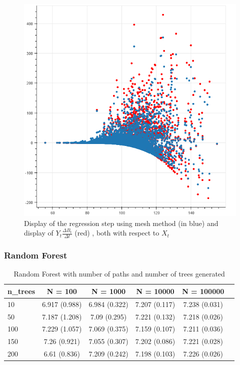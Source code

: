 \documentclass[english,11pt,openany]{report}
\theoremstyle{definition}
\theoremstyle{plain}
\theoremstyle{definition}
\begin{document}
\begin{figure}[H]
	\centering
	\captionsetup{width=0.8\textwidth}
	\includegraphics[scale = 0.3]{mesh/mesh.png}
	\caption{Display of the regression step using mesh method (in blue) and display of $Y_{t}\frac{\Delta B_t}{\Delta t}$ (red) , both with respect to $X_t$}
	
\end{figure}


 \subsubsection{Random Forest}




\begin{table}[H]
	\centering
	\caption{Random Forest with number of paths and number of trees generated}
	\label{table:rf1}
	\begin{tabular}{|l|c|c|c|c|c|}\hline
		n\_trees & N = 100           & N = 1000          & N = 10000         & N = 100000 \\ 
		\hline
		10 & 6.917 (0.988) & 6.984 (0.322) & 7.207 (0.117) & 7.238 (0.031) \\ \hline
		50 & 7.187 (1.208) & 7.09 (0.295)  & 7.221 (0.132) & 7.218 (0.026) \\ \hline
		100 & 7.229 (1.057) & 7.069 (0.375) & 7.159 (0.107) & 7.211 (0.036) \\ \hline
		150  & 7.26 (0.921)  & 7.055 (0.307) & 7.202 (0.086) & 7.221 (0.028) \\ \hline
		200 & 6.61 (0.836)  & 7.209 (0.242) & 7.198 (0.103) & 7.226 (0.026) \\ 
		\hline
		\hline
	\end{tabular}
\end{table}
\end{document}
